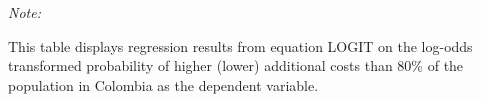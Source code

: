 \begin{table}[htbp!]
\begin{adjustbox}{width = 1\textwidth, max height = 0.95\textheight, center}
\begin{threeparttable}[b]
         \begin{tablenotes}\item \medskip \textit{Note:}
            \item This table displays regression results from equation LOGIT on the log-odds transformed probability of higher (lower) additional costs than 80\% of the population in Colombia as the dependent variable. 
         \end{tablenotes}
      \end{threeparttable}
   \end{adjustbox}
\end{table}


